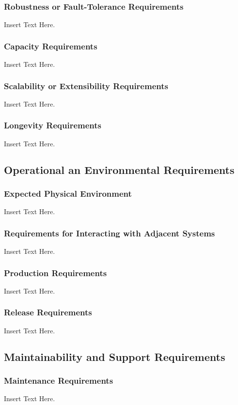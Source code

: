 \documentclass [12pt]{article}
\begin{document}
\subsubsection{Robustness or Fault-Tolerance Requirements }

		Insert Text Here.
\subsubsection{Capacity Requirements }
		Insert Text Here.

\subsubsection{Scalability or Extensibility Requirements }
		Insert Text Here. 
		
\subsubsection{Longevity Requirements }
		Insert Text Here.

\subsection{Operational an Environmental Requirements}
\subsubsection{Expected Physical Environment }
		Insert Text Here.
		
\subsubsection{Requirements for Interacting with Adjacent Systems}
		Insert Text Here.

\subsubsection{Production Requirements}
		Insert Text Here. 

\subsubsection{Release Requirements}
		Insert Text Here.		

\subsection{Maintainability and Support Requirements }
\subsubsection{Maintenance Requirements }
		Insert Text Here.
\end{document}
